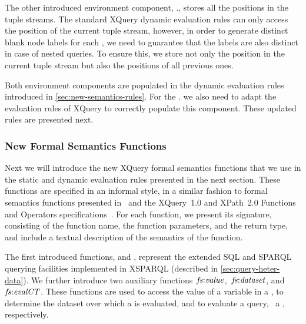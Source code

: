 The other introduced environment component, \dyn., stores all the positions in the tuple streams.
%
The standard XQuery dynamic evaluation rules can only access the position of the current tuple stream, however, in order
to generate distinct blank node labels for each \ConstructClause, we need to guarantee that the labels are also distinct
in case of nested queries.
%
To ensure this, we store not only the position in the current tuple stream but also the positions of all previous ones.


Both environment components are populated in the dynamic evaluation rules introduced in
\cref{sec:new-semantics-rules}.  For the \dyn. we also need to adapt the evaluation rules
of XQuery  to correctly populate this component.  These updated rules are presented next.






\subsubsection{New Formal Semantics Functions}
\label{sec:form-semant-funct}

Next we will introduce the new XQuery formal semantics functions that we use in the static and dynamic evaluation rules
presented in the next section.  These functions are specified in an informal style, in a similar fashion to formal
semantics functions presented in~\citet[Section~7.1]{DraperFankhauserFernandez:2010aa} and the XQuery~1.0 and XPath~2.0
Functions and Operators specifications~\cite{MalhotraMeltonWalsh:2010aa}.  For each function, we present its signature,
consisting of the function name, the function parameters, and the return type, and include a textual description of the
semantics of the function.

The first introduced functions,  and , represent the extended \ac{SQL} and
SPARQL querying facilities implemented in XSPARQL (described in \cref{sec:query-heter-data}).
%
We further introduce two auxiliary functions~$\mathit{fs{:}value}$,~$\mathit{fs{:}dataset}$,
and~$\mathit{fs{:}evalCT}$.  These functions are used to access the value of a variable in a ,
to determine the dataset over which a \SparqlForClause is evaluated, and to evaluate a \CONSTRUCT query, \ie~a
\ConstructTemplate, respectively.
%


